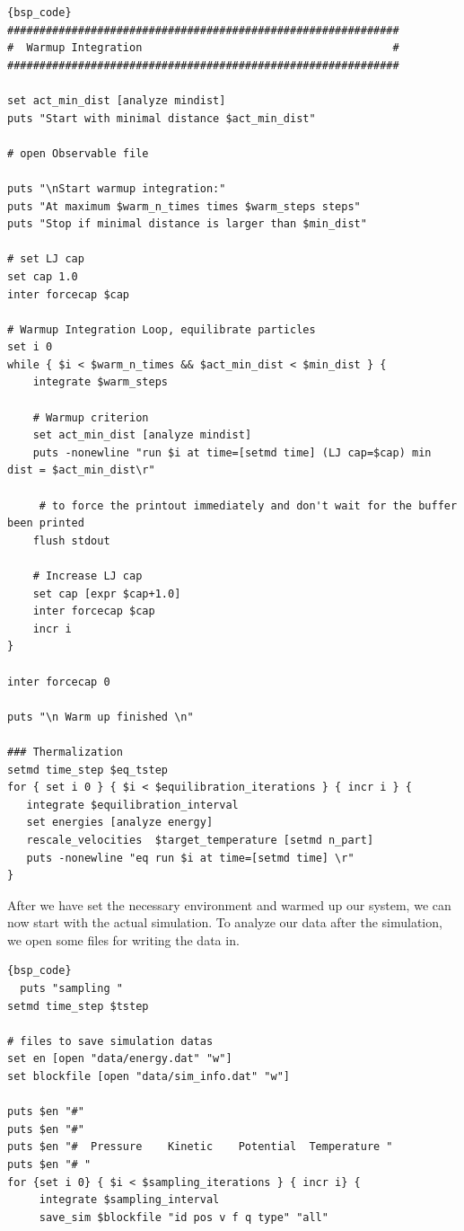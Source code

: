\documentclass[
paper=a4,                       %
fontsize=11pt,                  %
twoside,                        %
footsepline,                    %
headsepline,                    %
headinclude=false,              %
footinclude=false,              %
pagesize,                       %
]{scrartcl}
\begin{document}
{\small\vspace{0,2cm}
\begin{lstlisting}[firstnumber=auto]{bsp_code}
#############################################################
#  Warmup Integration                                       #
#############################################################

set act_min_dist [analyze mindist]
puts "Start with minimal distance $act_min_dist"

# open Observable file

puts "\nStart warmup integration:"
puts "At maximum $warm_n_times times $warm_steps steps"
puts "Stop if minimal distance is larger than $min_dist"

# set LJ cap
set cap 1.0
inter forcecap $cap

# Warmup Integration Loop, equilibrate particles
set i 0
while { $i < $warm_n_times && $act_min_dist < $min_dist } {
    integrate $warm_steps

    # Warmup criterion
    set act_min_dist [analyze mindist]
    puts -nonewline "run $i at time=[setmd time] (LJ cap=$cap) min dist = $act_min_dist\r"
    
     # to force the printout immediately and don't wait for the buffer been printed
    flush stdout

    # Increase LJ cap
    set cap [expr $cap+1.0]
    inter forcecap $cap
    incr i
}

inter forcecap 0

puts "\n Warm up finished \n"

### Thermalization 
setmd time_step $eq_tstep
for { set i 0 } { $i < $equilibration_iterations } { incr i } {
   integrate $equilibration_interval
   set energies [analyze energy]
   rescale_velocities  $target_temperature [setmd n_part]
   puts -nonewline "eq run $i at time=[setmd time] \r"
}

\end{lstlisting}}\vspace{0,2cm}

\noindent After we have set the necessary environment and warmed up our system, we can now start with the actual 
simulation. To analyze our data after the simulation, we open some files for writing the data in. 

{\small\vspace{0,2cm}
\begin{lstlisting}[firstnumber=auto]{bsp_code}
  puts "sampling "
setmd time_step $tstep

# files to save simulation datas
set en [open "data/energy.dat" "w"]
set blockfile [open "data/sim_info.dat" "w"]

puts $en "#"
puts $en "#"
puts $en "#  Pressure    Kinetic    Potential  Temperature "
puts $en "# "
for {set i 0} { $i < $sampling_iterations } { incr i} {
     integrate $sampling_interval
     save_sim $blockfile "id pos v f q type" "all"
\end{lstlisting}}\vspace{0,2cm}
\end{document}
